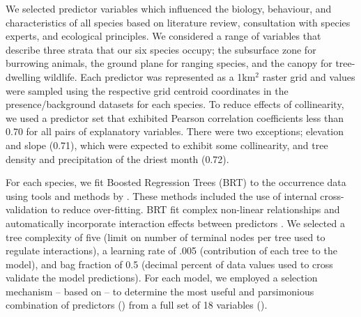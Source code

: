 We selected predictor variables which influenced the biology, behaviour, and characteristics of all species based on literature review, consultation with species experts, and ecological principles. We considered a range of variables that describe three strata that our six species occupy; the subsurface zone for burrowing animals, the ground plane for ranging species, and the canopy for tree-dwelling wildlife. Each predictor was represented as a 1km$^2$ raster grid and values were sampled using the respective grid centroid coordinates in the presence/background datasets for each species. To reduce effects of collinearity, we used a predictor set that exhibited Pearson correlation coefficients less than 0.70 for all pairs of explanatory variables. There were two exceptions; elevation and slope (0.71), which were expected to exhibit some collinearity, and tree density and precipitation of the driest month (0.72).

For each species, we fit Boosted Regression Trees (BRT) \citep{frie02} to the occurrence data using tools and methods by \cite{elit08}. These methods included the use of internal cross-validation to reduce over-fitting. BRT fit complex non-linear relationships and automatically incorporate interaction effects between predictors \citep{elit09}. We selected a tree complexity of five (limit on number of terminal nodes per tree used to regulate interactions), a learning rate of .005 (contribution of each tree to the model), and bag fraction of 0.5 (decimal percent of data values used to cross validate the model predictions). For each model, we employed a selection mechanism -- based on \cite{elit08} -- to determine the most useful and parsimonious combination of predictors () from a full set of 18 variables ().

